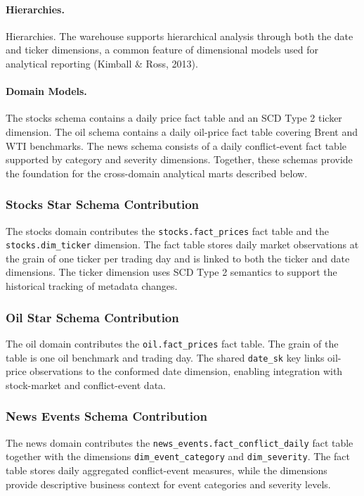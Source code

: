 \documentclass[11pt,a4paper]{article}
\begin{document}
\paragraph{Hierarchies.}
Hierarchies. The warehouse supports hierarchical analysis through both
the date and ticker dimensions, a common feature of dimensional models
used for analytical reporting (Kimball \& Ross, 2013).

\paragraph{Domain Models.}
The stocks schema contains a daily price fact table and an SCD Type 2
ticker dimension. The oil schema contains a daily oil-price fact table
covering Brent and WTI benchmarks. The news schema consists of a daily
conflict-event fact table supported by category and severity
dimensions. Together, these schemas provide the foundation for the
cross-domain analytical marts described below.

\subsubsection{Stocks Star Schema Contribution}
\label{sec:dw_stocks}

The stocks domain contributes the
\texttt{stocks.fact\_prices} fact table and the
\texttt{stocks.dim\_ticker} dimension. The fact table stores daily
market observations at the grain of one ticker per trading day and is
linked to both the ticker and date dimensions. The ticker dimension
uses SCD Type 2 semantics to support the historical tracking of
metadata changes.

\subsubsection{Oil Star Schema Contribution}
\label{sec:dw_oil}

The oil domain contributes the \texttt{oil.fact\_prices} fact table.
The grain of the table is one oil benchmark and trading day. The
shared \texttt{date\_sk} key links oil-price observations to the
conformed date dimension, enabling integration with stock-market and
conflict-event data.

\subsubsection{News Events Schema Contribution}
\label{sec:dw_news}

The news domain contributes the
\texttt{news\_events.fact\_conflict\_daily} fact table together with
the dimensions \texttt{dim\_event\_category} and
\texttt{dim\_severity}. The fact table stores daily aggregated
conflict-event measures, while the dimensions provide descriptive
business context for event categories and severity levels.
\end{document}
